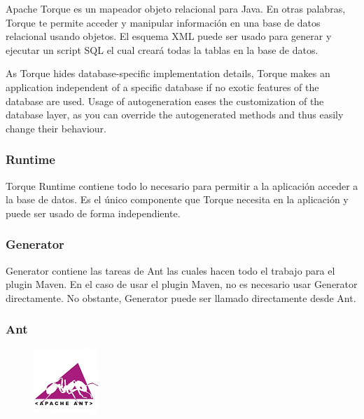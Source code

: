 \documentclass[12pt, oneside]{article}
\begin{document}
Apache Torque es un mapeador objeto relacional para Java. En otras palabras, Torque te permite acceder y manipular información en una base de datos relacional usando objetos. 
El esquema XML puede ser usado para generar y ejecutar un script SQL el cual creará todas la tablas en la base de datos.

As Torque hides database-specific implementation details, Torque makes an application independent of a specific database if no exotic features of the database are used.
Usage of autogeneration eases the customization of the database layer, as you can override the autogenerated methods and thus easily change their behaviour.

\subsubsection{Runtime}
Torque Runtime contiene todo lo necesario para permitir a la aplicación acceder a la base de datos. Es el único componente que Torque necesita en la aplicación y puede ser usado de forma independiente.

\subsubsection{Generator}
Generator contiene las tareas de Ant las cuales hacen todo el trabajo para el plugin Maven. En el caso de usar el plugin Maven, no es necesario usar Generator directamente. No obstante, Generator puede ser llamado directamente desde Ant.

\subsubsection{Ant}

\begin{figure}
	\includegraphics[scale=.9]{img/ant-logo.png}
\end{figure}
\end{document}
